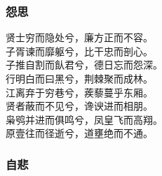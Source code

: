 \documentclass[]{article}
\begin{document}
\hypertarget{header-n3001}{%
\subsubsection{怨思}\label{header-n3001}}

贤士穷而隐处兮，廉方正而不容。\\
子胥谏而靡躯兮，比干忠而剖心。\\
子推自割而飤君兮，德日忘而怨深。\\
行明白而曰黑兮，荆棘聚而成林。\\
江离弃于穷巷兮，蒺藜蔓乎东厢。\\
贤者蔽而不见兮，谗谀进而相朋。\\
枭鸮并进而俱鸣兮，凤皇飞而高翔。\\
原壹往而径逝兮，道壅绝而不通。

\hypertarget{header-n3006}{%
\subsubsection{自悲}\label{header-n3006}}
\end{document}
